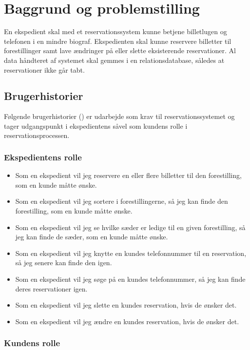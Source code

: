 \chapter{Baggrund og problemstilling}
\label{chapter:baggrund-og-problemstilling}

En ekspedient skal med et reservationssystem kunne betjene billetlugen og telefonen i en mindre biograf. Ekspedienten skal kunne reservere billetter til forestillinger samt lave ændringer på eller slette eksisterende reservationer. Al data håndteret af systemet skal gemmes i en relationsdatabase, således at reservationer ikke går tabt.

\section{Brugerhistorier}

Følgende brugerhistorier (\cite{wiki:user-story}) er udarbejde som krav til reservationssystemet og tager udgangspunkt i ekspedientens såvel som kundens rolle i reservationsprocessen.

\subsection{Ekspedientens rolle}

\begin{itemize}
  \item Som en ekspedient vil jeg reservere en eller flere billetter til den forestilling, som en kunde måtte ønske.
  \item Som en ekspedient vil jeg sortere i forestillingerne, så jeg kan finde den forestilling, som en kunde måtte ønske.
  \item Som en ekspedient vil jeg se hvilke sæder er ledige til en given forestilling, så jeg kan finde de sæder, som en kunde måtte ønske.
  \item Som en ekspedient vil jeg knytte en kundes telefonnummer til en reservation, så jeg senere kan finde den igen.
  \item Som en ekspedient vil jeg søge på en kundes telefonnummer, så jeg kan finde deres reservationer igen.
  \item Som en ekspedient vil jeg slette en kundes reservation, hvis de ønsker det.
  \item Som en ekspedient vil jeg ændre en kundes reservation, hvis de ønsker det.
\end{itemize}
  
\subsection{Kundens rolle}


